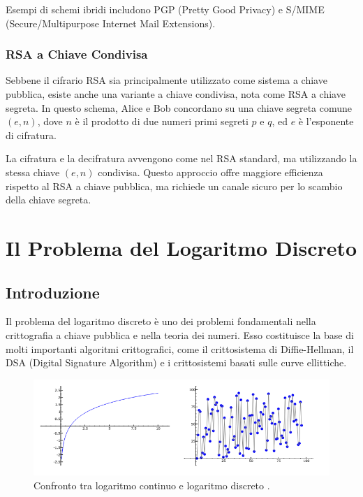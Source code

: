 \documentclass[a4paper,12pt]{report}
\begin{document}
Esempi di schemi ibridi includono PGP (Pretty Good Privacy) e S/MIME (Secure/Multipurpose Internet Mail Extensions).

\subsection{RSA a Chiave Condivisa}
Sebbene il cifrario RSA sia principalmente utilizzato come sistema a chiave pubblica, esiste anche una variante a chiave condivisa, nota come RSA a chiave segreta. In questo schema, Alice e Bob concordano su una chiave segreta comune $(e, n)$, dove $n$ è il prodotto di due numeri primi segreti $p$ e $q$, ed $e$ è l'esponente di cifratura.

La cifratura e la decifratura avvengono come nel RSA standard, ma utilizzando la stessa chiave $(e, n)$ condivisa. Questo approccio offre maggiore efficienza rispetto al RSA a chiave pubblica, ma richiede un canale sicuro per lo scambio della chiave segreta.
%
%
%
%
%
%
%
%
%
%
%
%
%
%
%
%
%
\chapter{Il Problema del Logaritmo Discreto}

\section{Introduzione}
Il problema del logaritmo discreto è uno dei problemi fondamentali nella crittografia a chiave pubblica e nella teoria dei numeri. Esso costituisce la base di molti importanti algoritmi crittografici, come il crittosistema di Diffie-Hellman, il DSA (Digital Signature Algorithm) e i crittosistemi basati sulle curve ellittiche.

\begin{figure}[ht]
    \centering
    \includegraphics[width=1.0\textwidth]{img/logarithms.png}
    \caption{Confronto tra logaritmo continuo e logaritmo discreto \cite{stein2008}.}
    \label{fig:logarithms}
\end{figure}
\end{document}
